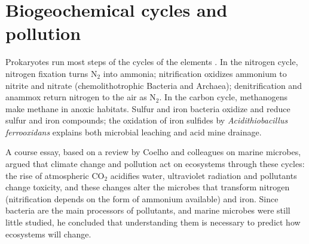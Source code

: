 \section{Biogeochemical cycles and pollution}
\label{section-cycles}

Prokaryotes run most steps of the cycles of
the elements \cite[Chapter
24]{madigan2012brock}. In the nitrogen cycle,
nitrogen fixation turns $\mathrm{N_2}$ into
ammonia; nitrification oxidizes ammonium to
nitrite and nitrate (chemolithotrophic
Bacteria and Archaea); denitrification and
anammox return nitrogen to the air as
$\mathrm{N_2}$. In the carbon cycle,
methanogens make methane in anoxic habitats.
Sulfur and iron bacteria oxidize and reduce
sulfur and iron compounds; the oxidation of
iron sulfides by \emph{Acidithiobacillus
ferrooxidans} explains both microbial
leaching and acid mine drainage.

A course essay, based on a
review by Coelho and colleagues on marine
microbes, argued that climate change and
pollution act on ecosystems through these
cycles: the rise of atmospheric
$\mathrm{CO_2}$ acidifies water, ultraviolet
radiation and pollutants change toxicity, and
these changes alter the microbes that
transform nitrogen (nitrification depends on
the form of ammonium available) and iron.
Since bacteria are the main processors of
pollutants, and marine microbes were still
little studied, he concluded that
understanding them is necessary to predict
how ecosystems will change.





